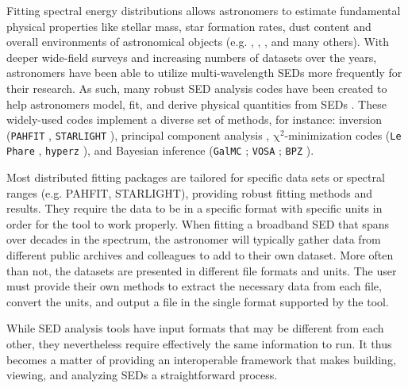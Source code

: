 \documentclass[preprint,12pt,3p]{elsarticle}
\begin{document}
Fitting spectral energy distributions allows astronomers to estimate fundamental physical properties like stellar mass, star formation rates, dust content and overall environments of astronomical objects (e.g. \citet{1998AJ....115.1329S}, \citet{2001ApJS..137..139S}, \citet{2007ApJS..169..328R}, and many others). With deeper wide-field surveys and increasing numbers of datasets over the years, astronomers have been able to utilize multi-wavelength SEDs more frequently for their research. As such, many robust SED analysis codes have been created to help astronomers model, fit, and derive physical quantities from SEDs \citep{2011Ap&SS.331....1W,2013ARA&A..51..393C}. These widely-used codes implement a diverse set of methods, for instance: inversion (\texttt{PAHFIT} \citep{2007ApJ...656..770S}, \texttt{STARLIGHT} \cite{2004MNRAS.355..273C}), principal component analysis \citep{2009MNRAS.394.1496B}, $\mathrm{\chi}^{2}$-minimization codes (\texttt{Le Phare} \citep{1999MNRAS.310..540A}, \texttt{hyperz} \citep{2000A&A...363..476B}), and Bayesian inference (\texttt{GalMC} \citep{2011ApJ...737...47A}; \texttt{VOSA} \citep{2008A&A...492..277B}; \texttt{BPZ} \citep{2000ApJ...536..571B}).

Most distributed fitting packages are tailored for specific data sets or spectral ranges (e.g. PAHFIT, STARLIGHT), providing robust fitting methods and results. They require the data to be in a specific format with specific units in order for the tool to work properly. When fitting a broadband SED that spans over decades in the spectrum, the astronomer will typically gather data from different public archives and colleagues to add to their own dataset. More often than not, the datasets are presented in different file formats and units. The user must provide their own methods to extract the necessary data from each file, convert the units, and output a file in the single format supported by the tool. 


While SED analysis tools have input formats that may be different from each other, they nevertheless require effectively the same information to run. It thus becomes a matter of providing an interoperable framework that makes building, viewing, and analyzing SEDs a straightforward process.

\end{document}
